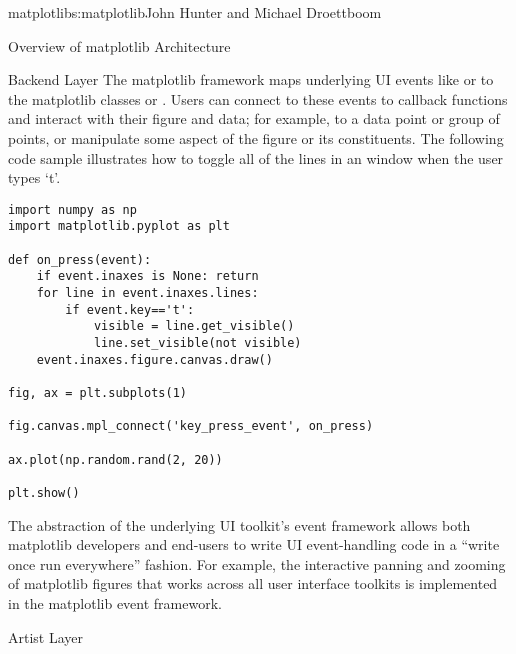 \begin{aosachapter}{matplotlib}{s:matplotlib}{John Hunter and Michael Droettboom}
\begin{aosasect1}{Overview of matplotlib Architecture}
\begin{aosasect2}{Backend Layer}
The matplotlib  framework maps underlying UI events like
 or \linebreak {} to the
matplotlib classes  or .
Users can connect to these events to callback functions and
interact with their figure and data; for example, to 
a data point or group of points, or manipulate some aspect of the 
figure or its constituents.  The following code sample illustrates
how to toggle all of the lines in an  window when the
user types `t'.


\begin{verbatim}
import numpy as np
import matplotlib.pyplot as plt

def on_press(event):
    if event.inaxes is None: return
    for line in event.inaxes.lines:
        if event.key=='t':
            visible = line.get_visible()
            line.set_visible(not visible)
    event.inaxes.figure.canvas.draw()

fig, ax = plt.subplots(1)

fig.canvas.mpl_connect('key_press_event', on_press)

ax.plot(np.random.rand(2, 20))

plt.show()
\end{verbatim}

The abstraction of the underlying UI toolkit's event framework allows
both matplotlib developers and end-users to write UI event-handling 
code in a ``write once run everywhere'' fashion. For example,
the interactive panning and zooming of matplotlib figures that works
across all user interface toolkits is implemented in the matplotlib
event framework.

\end{aosasect2}

\begin{aosasect2}{Artist Layer}


\end{aosasect2}
\end{aosasect1}
\end{aosachapter}
